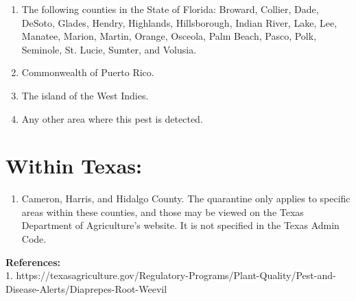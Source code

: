 \documentclass[12pt]{exam}
\begin{document}
\begin{enumerate}
\item The following counties in the State of Florida: Broward, Collier, Dade, DeSoto, Glades, Hendry, Highlands, Hillsborough, Indian River, Lake, Lee, Manatee, Marion, Martin, Orange, Osceola, Palm Beach, Pasco, Polk, Seminole, St. Lucie, Sumter, and Volusia.
\item Commonwealth of Puerto Rico.
\item The island of the West Indies.
\item Any other area where this pest is detected.
\end{enumerate}

\section{Within Texas:}
\begin{enumerate}
\item Cameron, Harris, and Hidalgo County. The quarantine only applies to specific areas within these counties, and those may be viewed on the Texas Department of Agriculture's website. It is not specified in the Texas Admin Code.
\end{enumerate}
\newpage

\textbf{References:}\\
1. https://texasagriculture.gov/Regulatory-Programs/Plant-Quality/Pest-and-Disease-Alerts/Diaprepes-Root-Weevil
\end{document}
